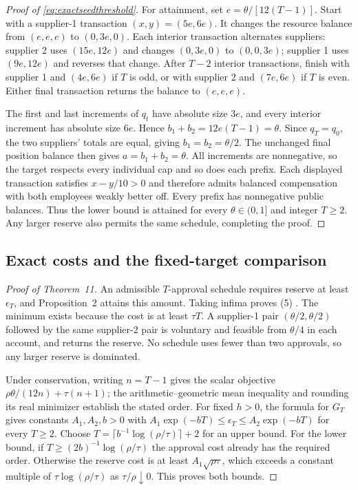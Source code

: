 \documentclass[ecta,draft,supplement]{econsocart}
\theoremstyle{definition}
\theoremstyle{definition}
\begin{document}
\begin{appendix}
\begin{proof}[Proof of \eqref{eq:exactseedthreshold}]
For attainment, set $e=\theta/[12(T-1)]$. Start with a supplier-1
transaction $(x,y)=(5e,6e)$. It changes the resource balance from
$(e,e,e)$ to $(0,3e,0)$. Each interior transaction alternates suppliers:
supplier 2 uses $(15e,12e)$ and changes $(0,3e,0)$ to $(0,0,3e)$;
supplier 1 uses $(9e,12e)$ and reverses that change. After $T-2$
interior transactions, finish with supplier 1 and $(4e,6e)$ if $T$
is odd, or with supplier 2 and $(7e,6e)$ if $T$ is even. Either final
transaction returns the balance to $(e,e,e)$.

The first and last increments of $q_t$ have absolute size $3e$,
and every interior increment has absolute size $6e$. Hence
$b_1+b_2=12e(T-1)=\theta$. Since $q_T=q_0$, the two suppliers'
totals are equal, giving $b_1=b_2=\theta/2$. The unchanged final
position balance then gives $a=b_1+b_2=\theta$.
All increments are nonnegative, so the target respects every individual
cap and so does each prefix. Each displayed transaction satisfies
$x-y/10>0$ and therefore admits balanced compensation with both employees
weakly better off. Every prefix has nonnegative public balances. Thus the
lower bound is attained for every $\theta\in(0,1]$ and integer $T\geq2$.
Any larger reserve also permits the same schedule, completing the proof.
\end{proof}

\subsection{Exact costs and the fixed-target comparison}
\begin{proof}[Proof of Theorem~11%
]
An admissible $T$-approval schedule requires reserve at least
$\epsilon_T$, and Proposition~2%
 attains this amount.
Taking infima proves \textup{(5)}%
. The minimum exists because
the cost is at least $\tau T$. A supplier-1 pair $(\theta/2,\theta/2)$ followed
by the same supplier-2 pair is voluntary and feasible from $\theta/4$ in each
account, and returns the reserve. No schedule uses fewer than two approvals,
so any larger reserve is dominated.

Under conservation, writing $n=T-1$ gives the scalar objective
$\rho\theta/(12n)+\tau(n+1)$; the arithmetic--geometric mean inequality and
rounding its real minimizer establish the stated order. For fixed $h>0$,
the formula for $G_T$ gives constants $A_1,A_2,b>0$ with
$A_1\exp(-bT)\leq\epsilon_T\leq A_2\exp(-bT)$ for every $T\geq2$.
Choose $T=\lceil b^{-1}\log(\rho/\tau)\rceil+2$ for an upper bound.
For the lower bound, if $T\geq(2b)^{-1}\log(\rho/\tau)$ the approval cost
already has the required order. Otherwise the reserve cost is at least
$A_1\sqrt{\rho\tau}$, which exceeds a constant multiple of
$\tau\log(\rho/\tau)$ as $\tau/\rho\downarrow0$. This proves both bounds.
\end{proof}


\end{appendix}
\end{document}
